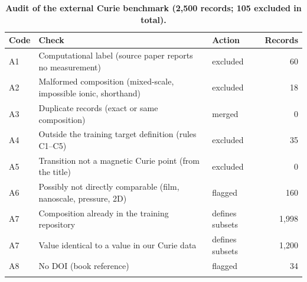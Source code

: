 \documentclass[pdflatex,sn-nature]{sn-jnl}
\begin{document}
\begin{table}[!ht]
\caption{\textbf{Audit of the external Curie benchmark (2,500 records; 105 excluded in total).}}\label{tab:s1}%
\begin{tabular*}{\textwidth}{@{\extracolsep\fill}lp{215pt}lr@{}}
\toprule
Code & Check & Action & Records \\
\midrule
A1 & Computational label (source paper reports no measurement) & excluded & 60 \\
A2 & Malformed composition (mixed-scale, impossible ionic, shorthand) & excluded & 18 \\
A3 & Duplicate records (exact or same composition) & merged & 0 \\
A4 & Outside the training target definition (rules C1--C5) & excluded & 35 \\
A5 & Transition not a magnetic Curie point (from the title) & excluded & 0 \\
A6 & Possibly not directly comparable (film, nanoscale, pressure, 2D) & flagged & 160 \\
A7 & Composition already in the training repository & defines subsets & 1,998 \\
A7 & Value identical to a value in our Curie data & defines subsets & 1,200 \\
A8 & No DOI (book reference) & flagged & 34 \\
\botrule
\end{tabular*}
\end{table}
\end{document}
